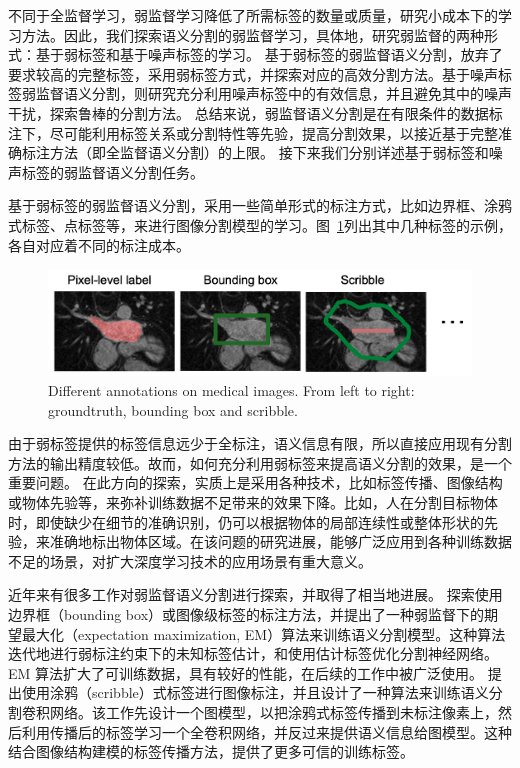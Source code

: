 不同于全监督学习，弱监督学习降低了所需标签的数量或质量，研究小成本下的学习方法。因此，我们探索语义分割的弱监督学习，具体地，研究弱监督的两种形式：基于弱标签和基于噪声标签的学习。
基于弱标签的弱监督语义分割\citep{papandreou2015weakly,rajchl2016deepcut,cai2018accurate,ji2019scribble,kervadec2020bounding}，放弃了要求较高的完整标签，采用弱标签方式，并探索对应的高效分割方法。基于噪声标签弱监督语义分割\citep{Zhu2019PickandLearnAQ,Xue2020CascadedRL,Zhang2020RobustMI}，则研究充分利用噪声标签中的有效信息，并且避免其中的噪声干扰，探索鲁棒的分割方法。
总结来说，弱监督语义分割是在有限条件的数据标注下，尽可能利用标签关系或分割特性等先验，提高分割效果，以接近基于完整准确标注方法（即全监督语义分割）的上限。
接下来我们分别详述基于弱标签和噪声标签的弱监督语义分割任务。

基于弱标签的弱监督语义分割，采用一些简单形式的标注方式，比如边界框、涂鸦式标签、点标签等，来进行图像分割模型的学习。图~\ref{c1_fig2}列出其中几种标签的示例，各自对应着不同的标注成本。
    \begin{figure}[tbp]
        \centering 
        \includegraphics[width=1.0\textwidth]{img/c1/intro_2.png}
        {Different annotations on medical images. From left to right: groundtruth, bounding box and scribble.}
        \label{c1_fig2}
    \end{figure}
由于弱标签提供的标签信息远少于全标注，语义信息有限，所以直接应用现有分割方法的输出精度较低。故而，如何充分利用弱标签来提高语义分割的效果，是一个重要问题。
在此方向的探索，实质上是采用各种技术，比如标签传播、图像结构或物体先验等，来弥补训练数据不足带来的效果下降。比如，人在分割目标物体时，即使缺少在细节的准确识别，仍可以根据物体的局部连续性或整体形状的先验，来准确地标出物体区域。在该问题的研究进展，能够广泛应用到各种训练数据不足的场景，对扩大深度学习技术的应用场景有重大意义。

近年来有很多工作对弱监督语义分割进行探索，并取得了相当地进展。
\citet{papandreou2015weakly} 探索使用边界框（bounding box）或图像级标签的标注方法，并提出了一种弱监督下的期望最大化（expectation maximization, EM）算法来训练语义分割模型。这种算法迭代地进行弱标注约束下的未知标签估计，和使用估计标签优化分割神经网络。EM 算法扩大了可训练数据，具有较好的性能，在后续的工作中被广泛使用。
\citet{lin2016scribblesup} 提出使用涂鸦（scribble）式标签进行图像标注，并且设计了一种算法来训练语义分割卷积网络。该工作先设计一个图模型，以把涂鸦式标签传播到未标注像素上，然后利用传播后的标签学习一个全卷积网络，并反过来提供语义信息给图模型。这种结合图像结构建模的标签传播方法，提供了更多可信的训练标签。


